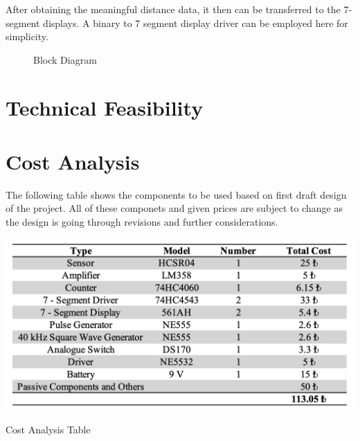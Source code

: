 \documentclass[12pt, a4paper]{article}
\begin{document}
        \bigskip
        After obtaining the meaningful distance data, it then can be transferred to the 7-segment displays. A binary to 7 segment display driver can be employed here for simplicity.

        \pagebreak
        \begin{landscape}\centering
            \vspace*{1.8cm}
            \begin{figure}[H]\centering
                \caption{Block Diagram}
            \end{figure}
        \end{landscape}
        \vfill
        \pagebreak


    \section{Technical Feasibility}
    
    \section{Cost Analysis}

        The following table shows the components to be used based on first draft design of the project. All of these componets and given prices are subject to change as the design is going through revisions and further considerations.
        
        \begin{table}[H]\centering
            \includegraphics[width=\textwidth]{CostAnalysis.png}
            \caption[]{Cost Analysis Table}\label{tab:cost}
        \end{table}
\end{document}
